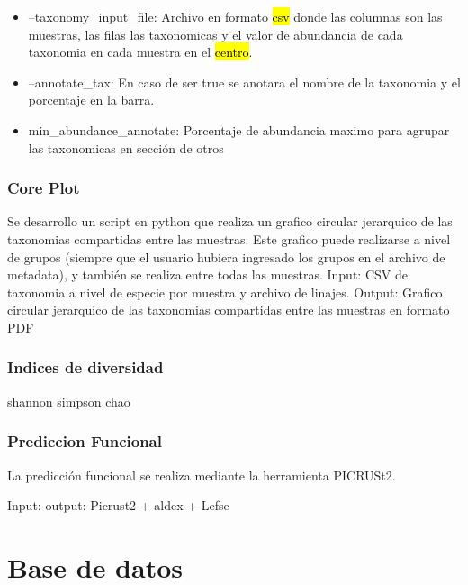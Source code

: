 \begin{itemize}
    \item --taxonomy\_input\_file: Archivo en formato \hl{csv} donde las columnas son las muestras, las filas las taxonomicas y el valor de abundancia de cada taxonomia en cada muestra en el \hl{centro}.
    \item --annotate\_tax: En caso de ser true se anotara el nombre de la taxonomia y el porcentaje en la barra.
    \item min\_abundance\_annotate: Porcentaje de abundancia maximo para agrupar las taxonomicas en sección de otros
\end{itemize}

\subsubsection{Core Plot}
Se desarrollo un script en python que realiza un grafico circular jerarquico de las taxonomias compartidas entre las muestras.
Este grafico puede realizarse a nivel de grupos (siempre que el usuario hubiera ingresado los grupos en el archivo de metadata), y también se realiza entre todas las muestras.
Input: CSV de taxonomia a nivel de especie por muestra y archivo de linajes.
Output: Grafico circular jerarquico de las taxonomias compartidas entre las muestras en formato PDF
\subsubsection{Indices de diversidad}
shannon simpson chao

\subsubsection{Prediccion Funcional}
La predicción funcional se realiza mediante la herramienta PICRUSt2.

Input:
output:
Picrust2 + aldex + Lefse

\section{Base de datos}


